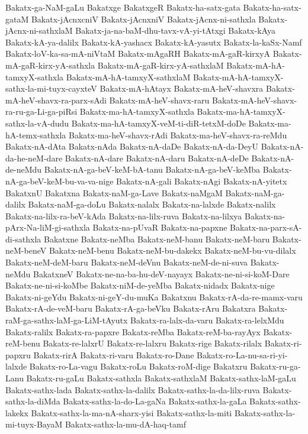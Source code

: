 {Bakatx-ga-NaM-gaLu
Bakatxge
BakatxgeR
Bakatx-ha-satx-gata
Bakatx-ha-satx-gataM
Bakatx-jAcnxcniV
Bakatx-jAcnxniV
Bakatx-jAcnx-ni-sathxla
Bakatx-jAcnx-ni-sathxlaM
Bakatx-ja-na-baM-dhu-tavx-vA-yi-tAtxgi
Bakatx-kAya
Bakatx-kA-ya-dalilx
Bakatx-kA-yashacx
Bakatx-kA-yasutx
Bakatx-la-kaSx-Namf
Bakatx-loV-ka-sa-mA-niVtaM
Bakatx-mAgaRH
Bakatx-mA-gaR-kirxyA
Bakatx-mA-gaR-kirx-yA-sathxla
Bakatx-mA-gaR-kirx-yA-sathxlaM
Bakatx-mA-hA-tamxyX-sathxla
Bakatx-mA-hA-tamxyX-sathxlaM
Bakatx-mA-hA-tamxyX-sathx-la-mi-tuyx-cayxteV
Bakatx-mA-hAtayx
Bakatx-mA-heV-shavxra
Bakatx-mA-heV-shavx-ra-parx-sAdi
Bakatx-mA-heV-shavx-raru
Bakatx-mA-heV-shavx-ra-ru-ga-Li-ga-piRsi
Bakatx-ma-hA-tamxyX-sathxla
Bakatx-ma-hA-tamxyX-sathx-la-vA-dudu
Bakatx-ma-hA-tamxyX-veM-ti-diR-tetxM-doDe
Bakatx-ma-hA-temx-sathxla
Bakatx-ma-heV-shavx-rAdi
Bakatx-ma-heV-shavx-ra-reMdu
Bakatx-nA-dAta
Bakatx-nAda
Bakatx-nA-daDe
Bakatx-nA-da-DeyU
Bakatx-nA-da-he-neM-dare
Bakatx-nA-dare
Bakatx-nA-daru
Bakatx-nA-deDe
Bakatx-nA-de-neMdu
Bakatx-nA-ga-beV-keM-bA-tanu
Bakatx-nA-ga-beV-keMba
Bakatx-nA-ga-beV-keM-bu-va-va-nige
Bakatx-nA-gali
Bakatx-nAgi
Bakatx-nA-yitetx
BakatxnU
Bakatxna
Bakatx-naM-ga-Lave
Bakatx-naMgaM
Bakatx-naM-ga-dalilx
Bakatx-naM-ga-doLu
Bakatx-nalalx
Bakatx-na-lalxde
Bakatx-nalilx
Bakatx-na-lilx-ra-beV-kAda
Bakatx-na-lilx-ruva
Bakatx-na-lilxya
Bakatx-na-pArx-Na-liM-gi-sathxla
Bakatx-na-pUvaR
Bakatx-na-papxne
Bakatx-na-parx-sA-di-sathxla
Bakatxne
Bakatx-neMba
Bakatx-neM-banu
Bakatx-neM-baru
Bakatx-neM-beneV
Bakatx-neM-benu
Bakatx-neM-bu-dakekx
Bakatx-neM-bu-vu-dilalx
Bakatx-neM-deM-baru
Bakatx-neM-deVnu
Bakatx-neM-de-ni-suva
Bakatx-neMdu
BakatxneV
Bakatx-ne-na-ba-hu-deV-nayayx
Bakatx-ne-ni-si-koM-Dare
Bakatx-ne-ni-si-koMbe
Bakatx-niM-de-yeMba
Bakatx-nidadx
Bakatx-nige
Bakatx-ni-geYdu
Bakatx-ni-geY-du-muKa
Bakatxnu
Bakatx-rA-da-re-mamx-varu
Bakatx-rA-de-veM-baru
Bakatx-rA-ga-beVku
Bakatx-rAru
Bakatxra
Bakatx-raM-ga-sathx-laM-ga-LiM-tAyutx
Bakatx-ra-lalx-da-varu
Bakatx-ra-lelxMdu
Bakatx-ralilx
Bakatx-ra-papxre
Bakatx-reMba
Bakatx-reM-ba-rayAyx
Bakatx-reM-benu
Bakatx-re-lalxrU
Bakatx-re-lalxru
Bakatx-rige
Bakatx-rilalx
Bakatx-ri-papxru
Bakatx-rirA
Bakatx-ri-varu
Bakatx-ro-Dane
Bakatx-ro-La-nu-sa-ri-yi-lalxde
Bakatx-ro-La-vagu
Bakatx-roLu
Bakatx-roM-dige
Bakatxru
Bakatx-ru-ga-Lanu
Bakatx-ru-gaLu
Bakatx-sathxla
Bakatx-sathxlaM
Bakatx-sathx-laM-gaLu
Bakatx-sathx-lada
Bakatx-sathx-la-dalilx
Bakatx-sathx-la-da-lilx-ruva
Bakatx-sathx-la-diMda
Bakatx-sathx-la-do-La-gaNa
Bakatx-sathx-la-gaLa
Bakatx-sathx-lakekx
Bakatx-sathx-la-ma-nA-sharx-yisi
Bakatx-sathx-la-miti
Bakatx-sathx-la-mi-tuyx-BayaM
Bakatx-sathx-la-mu-dA-haq-tamf
}
